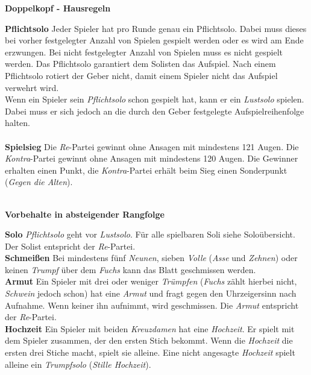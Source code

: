 \documentclass[11pt,a4paper,landscape]{article}
\begin{document}
\begin{center}
\textbf{Doppelkopf - Hausregeln}
\end{center}

\begin{multicols}{3}

\textbf{Pflichtsolo} Jeder Spieler hat pro Runde genau ein Pflichtsolo. Dabei muss dieses bei vorher festgelegter Anzahl von Spielen gespielt werden oder es wird am Ende erzwungen. Bei nicht festgelegter Anzahl von Spielen muss es nicht gespielt werden. Das Pflichtsolo garantiert dem Solisten das Aufspiel. Nach einem Pflichtsolo rotiert der Geber nicht, damit einem Spieler nicht das Aufspiel verwehrt wird.  \\
Wenn ein Spieler sein \textit{Pflichtsolo} schon gespielt hat, kann er ein \textit{Lustsolo} spielen. Dabei muss er sich jedoch an die durch den Geber festgelegte Aufspielreihenfolge halten.\\
\vspace*{-0.3cm}\\
\textbf{Spielsieg} Die \textit{Re}-Partei gewinnt ohne Ansagen mit mindestens 121 Augen. Die \textit{Kontra}-Partei gewinnt ohne Ansagen mit mindestens 120 Augen. Die Gewinner erhalten einen Punkt, die \textit{Kontra}-Partei erhält beim Sieg einen Sonderpunkt (\textit{Gegen die Alten}). \\
\vspace*{-1cm}\\
\begin{center}
\textbf{Vorbehalte in absteigender Rangfolge}
\end{center}
\textbf{Solo} \textit{Pflichtsolo} geht vor \textit{Lustsolo}. Für alle spielbaren Soli siehe Soloübersicht. Der Solist entspricht der \textit{Re}-Partei. \\
\textbf{Schmeißen} Bei mindestens fünf \textit{Neunen}, sieben \textit{Volle} (\textit{Asse} und \textit{Zehnen}) oder keinen \textit{Trumpf} über dem \textit{Fuchs} kann das Blatt geschmissen werden. \\
\textbf{Armut} Ein Spieler mit drei oder weniger \textit{Trümpfen} (\textit{Fuchs} zählt hierbei nicht, \textit{Schwein} jedoch schon) hat eine \textit{Armut} und fragt gegen den Uhrzeigersinn nach Aufnahme. Wenn keiner ihn aufnimmt, wird geschmissen. Die \textit{Armut} entspricht der \textit{Re}-Partei. \\
\textbf{Hochzeit} Ein Spieler mit beiden \textit{Kreuzdamen} hat eine \textit{Hochzeit}. Er spielt mit dem Spieler zusammen, der den ersten Stich bekommt. Wenn die \textit{Hochzeit} die ersten drei Stiche macht, spielt sie alleine. Eine nicht angesagte \textit{Hochzeit} spielt alleine ein \textit{Trumpfsolo} (\textit{Stille Hochzeit}). 
\columnbreak


\end{multicols}
\end{document}
